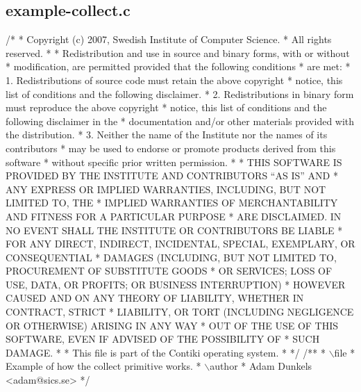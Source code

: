 \hypertarget{a00018}{}\subsection{example-\/collect.\+c}

\begin{DoxyCodeInclude}
\textcolor{comment}{/*}
\textcolor{comment}{ * Copyright (c) 2007, Swedish Institute of Computer Science.}
\textcolor{comment}{ * All rights reserved.}
\textcolor{comment}{ *}
\textcolor{comment}{ * Redistribution and use in source and binary forms, with or without}
\textcolor{comment}{ * modification, are permitted provided that the following conditions}
\textcolor{comment}{ * are met:}
\textcolor{comment}{ * 1. Redistributions of source code must retain the above copyright}
\textcolor{comment}{ *    notice, this list of conditions and the following disclaimer.}
\textcolor{comment}{ * 2. Redistributions in binary form must reproduce the above copyright}
\textcolor{comment}{ *    notice, this list of conditions and the following disclaimer in the}
\textcolor{comment}{ *    documentation and/or other materials provided with the distribution.}
\textcolor{comment}{ * 3. Neither the name of the Institute nor the names of its contributors}
\textcolor{comment}{ *    may be used to endorse or promote products derived from this software}
\textcolor{comment}{ *    without specific prior written permission.}
\textcolor{comment}{ *}
\textcolor{comment}{ * THIS SOFTWARE IS PROVIDED BY THE INSTITUTE AND CONTRIBUTORS ``AS IS'' AND}
\textcolor{comment}{ * ANY EXPRESS OR IMPLIED WARRANTIES, INCLUDING, BUT NOT LIMITED TO, THE}
\textcolor{comment}{ * IMPLIED WARRANTIES OF MERCHANTABILITY AND FITNESS FOR A PARTICULAR PURPOSE}
\textcolor{comment}{ * ARE DISCLAIMED.  IN NO EVENT SHALL THE INSTITUTE OR CONTRIBUTORS BE LIABLE}
\textcolor{comment}{ * FOR ANY DIRECT, INDIRECT, INCIDENTAL, SPECIAL, EXEMPLARY, OR CONSEQUENTIAL}
\textcolor{comment}{ * DAMAGES (INCLUDING, BUT NOT LIMITED TO, PROCUREMENT OF SUBSTITUTE GOODS}
\textcolor{comment}{ * OR SERVICES; LOSS OF USE, DATA, OR PROFITS; OR BUSINESS INTERRUPTION)}
\textcolor{comment}{ * HOWEVER CAUSED AND ON ANY THEORY OF LIABILITY, WHETHER IN CONTRACT, STRICT}
\textcolor{comment}{ * LIABILITY, OR TORT (INCLUDING NEGLIGENCE OR OTHERWISE) ARISING IN ANY WAY}
\textcolor{comment}{ * OUT OF THE USE OF THIS SOFTWARE, EVEN IF ADVISED OF THE POSSIBILITY OF}
\textcolor{comment}{ * SUCH DAMAGE.}
\textcolor{comment}{ *}
\textcolor{comment}{ * This file is part of the Contiki operating system.}
\textcolor{comment}{ *}
\textcolor{comment}{ */}
\textcolor{comment}{}
\textcolor{comment}{/**}
\textcolor{comment}{ * \(\backslash\)file}
\textcolor{comment}{ *         Example of how the collect primitive works.}
\textcolor{comment}{ * \(\backslash\)author}
\textcolor{comment}{ *         Adam Dunkels <adam@sics.se>}
\textcolor{comment}{ */}


\end{DoxyCodeInclude}
